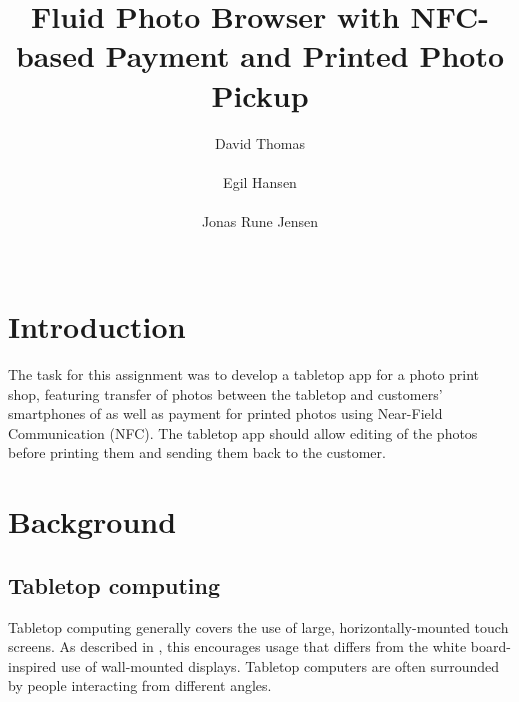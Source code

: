 \documentclass{ubicomp2011}
\begin{document}
\setlength{\paperheight}{11in}
\setlength{\paperwidth}{8.5in}
\setlength{\pdfpageheight}{\paperheight}
\setlength{\pdfpagewidth}{\paperwidth}

\toappear{}

\title{Fluid Photo Browser with NFC-based Payment and Printed Photo Pickup}
\author{
  \alignauthor David Thomas\\
    \\
  \alignauthor Egil Hansen\\
    \\
 \alignauthor Jonas Rune Jensen\\
    \\
    }

\maketitle

\section{Introduction}
The task for this assignment was to develop a tabletop app for a photo print shop, featuring transfer of photos between the tabletop and customers’ smartphones of as well as payment for printed photos using Near-Field Communication (NFC). The tabletop app should allow editing of the photos before printing them and sending them back to the customer.

\section{Background}

\subsection{Tabletop computing}\label{tabletopTheory}
Tabletop computing generally covers the use of large, horizontally-mounted touch screens. As described in \cite{integratingTechnology}, this encourages usage that differs from the white board-inspired use of wall-mounted displays. Tabletop computers are often surrounded by people interacting from different angles.
\end{document}
